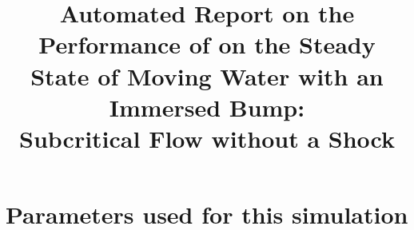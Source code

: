 \documentclass[11pt,a4paper]{article}%
\begin{document}
 

\title{Automated Report on the Performance of \anuga{} on the Steady State of Moving Water with an Immersed Bump:\\Subcritical Flow without a Shock}
\maketitle




\section{Parameters used for this simulation}






\end{document}
